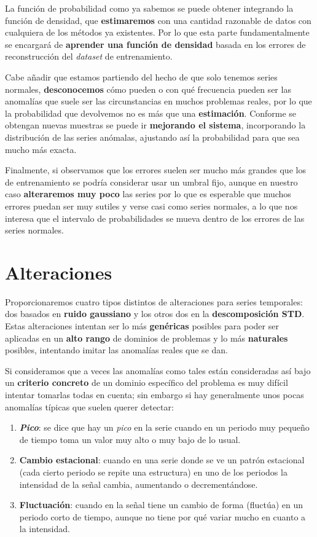 La función de probabilidad como ya sabemos se puede obtener integrando la función de densidad, que \textbf{estimaremos} con una cantidad razonable de datos con cualquiera de los métodos ya existentes. Por lo que esta parte fundamentalmente se encargará de \textbf{aprender una función de densidad} basada en los errores de reconstrucción del \emph{dataset} de entrenamiento.

Cabe añadir que estamos partiendo del hecho de que solo tenemos series normales, \textbf{desconocemos} cómo pueden o con qué frecuencia pueden ser las anomalías  que suele ser las circunstancias en muchos problemas reales, por lo que la probabilidad que devolvemos no es más que una \textbf{estimación}. Conforme se obtengan nuevas muestras se puede ir \textbf{mejorando el sistema}, incorporando la distribución de las series anómalas, ajustando así la probabilidad para que sea mucho más exacta.

Finalmente, si observamos que los errores suelen ser mucho más grandes que los de entrenamiento se podría considerar usar un umbral fijo, aunque en nuestro caso \textbf{alteraremos muy poco} las series por lo que es esperable que muchos errores puedan ser muy sutiles y verse casi como series normales, a lo que nos interesa que el intervalo de probabilidades se mueva dentro de los errores de las series normales.

\chapter{Alteraciones}\label{ch:ad-alteraciones}

Proporcionaremos cuatro tipos distintos de alteraciones para series temporales: dos basados en \textbf{ruido gaussiano} y los otros dos en la \textbf{descomposición STD}. Estas alteraciones intentan ser lo más \textbf{genéricas} posibles para poder ser aplicadas en un \textbf{alto rango} de dominios de problemas y lo más \textbf{naturales} posibles, intentando imitar las anomalías reales que se dan.

Si consideramos que a veces las anomalías como tales están consideradas así bajo un \textbf{criterio concreto} de un dominio específico del problema es muy difícil intentar tomarlas todas en cuenta; sin embargo si hay generalmente unos pocas anomalías típicas que suelen querer detectar:

\begin{enumerate}
  \item \textbf{\emph{Pico}}: se dice que hay un \emph{pico} en la serie cuando en un periodo muy pequeño de tiempo toma un valor muy alto o muy bajo de lo usual.
  \item \textbf{Cambio estacional}: cuando en una serie donde se ve un patrón estacional (cada cierto periodo se repite una estructura) en uno de los periodos la intensidad de la señal cambia, aumentando o decrementándose.
  \item \textbf{Fluctuación}: cuando en la señal tiene un cambio de forma (fluctúa) en un periodo corto de tiempo, aunque no tiene por qué variar mucho en cuanto a la intensidad.
\end{enumerate}

